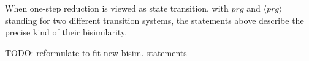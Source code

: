 \documentclass[11pt]{article} %
\begin{document}
%
%
%
%

When one-step reduction is viewed as state transition, with $prg$ and $\langle prg \rangle$ standing for two different transition systems, the statements above describe the precise kind of their bisimilarity.

TODO: reformulate to fit new bisim. statements

%
%
\end{document}
